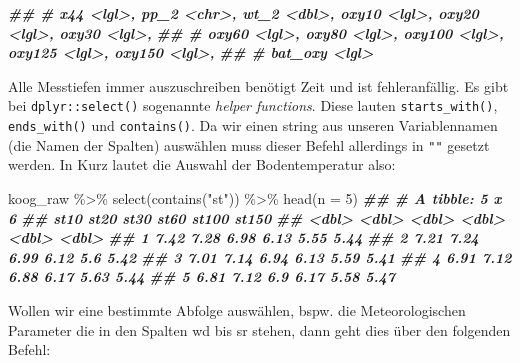 \documentclass[
]{article}
\newenvironment{Shaded}{\begin{snugshade}}{\end{snugshade}}
\newcommand{\AttributeTok}[1]{\textcolor[rgb]{0.77,0.63,0.00}{#1}}
\newcommand{\DecValTok}[1]{\textcolor[rgb]{0.00,0.00,0.81}{#1}}
\newcommand{\DocumentationTok}[1]{\textcolor[rgb]{0.56,0.35,0.01}{\textbf{\textit{#1}}}}
\newcommand{\FunctionTok}[1]{\textcolor[rgb]{0.00,0.00,0.00}{#1}}
\newcommand{\NormalTok}[1]{#1}
\newcommand{\SpecialCharTok}[1]{\textcolor[rgb]{0.00,0.00,0.00}{#1}}
\newcommand{\StringTok}[1]{\textcolor[rgb]{0.31,0.60,0.02}{#1}}
\begin{document}
\begin{Shaded}
\begin{Highlighting}[]
\DocumentationTok{\#\# \#   x44 \textless{}lgl\textgreater{}, pp\_2 \textless{}chr\textgreater{}, wt\_2 \textless{}dbl\textgreater{}, oxy10 \textless{}lgl\textgreater{}, oxy20 \textless{}lgl\textgreater{}, oxy30 \textless{}lgl\textgreater{},}
\DocumentationTok{\#\# \#   oxy60 \textless{}lgl\textgreater{}, oxy80 \textless{}lgl\textgreater{}, oxy100 \textless{}lgl\textgreater{}, oxy125 \textless{}lgl\textgreater{}, oxy150 \textless{}lgl\textgreater{},}
\DocumentationTok{\#\# \#   bat\_oxy \textless{}lgl\textgreater{}}
\end{Highlighting}
\end{Shaded}

Alle Messtiefen immer auszuschreiben benötigt Zeit und ist fehleranfällig. Es gibt bei \texttt{dplyr::select()} sogenannte \emph{helper functions}. Diese lauten \texttt{starts\_with()}, \texttt{ends\_with()} und \texttt{contains()}. Da wir einen string aus unseren Variablennamen (die Namen der Spalten) auswählen muss dieser Befehl allerdings in \texttt{""} gesetzt werden. In Kurz lautet die Auswahl der Bodentemperatur also:

\begin{Shaded}
\begin{Highlighting}[]
\NormalTok{koog\_raw }\SpecialCharTok{\%\textgreater{}\%}
  \FunctionTok{select}\NormalTok{(}\FunctionTok{contains}\NormalTok{(}\StringTok{"st"}\NormalTok{)) }\SpecialCharTok{\%\textgreater{}\%}
  \FunctionTok{head}\NormalTok{(}\AttributeTok{n =} \DecValTok{5}\NormalTok{)}
\DocumentationTok{\#\# \# A tibble: 5 x 6}
\DocumentationTok{\#\#    st10  st20  st30  st60 st100 st150}
\DocumentationTok{\#\#   \textless{}dbl\textgreater{} \textless{}dbl\textgreater{} \textless{}dbl\textgreater{} \textless{}dbl\textgreater{} \textless{}dbl\textgreater{} \textless{}dbl\textgreater{}}
\DocumentationTok{\#\# 1  7.42  7.28  6.98  6.13  5.55  5.44}
\DocumentationTok{\#\# 2  7.21  7.24  6.99  6.12  5.6   5.42}
\DocumentationTok{\#\# 3  7.01  7.14  6.94  6.13  5.59  5.41}
\DocumentationTok{\#\# 4  6.91  7.12  6.88  6.17  5.63  5.44}
\DocumentationTok{\#\# 5  6.81  7.12  6.9   6.17  5.58  5.47}
\end{Highlighting}
\end{Shaded}

Wollen wir eine bestimmte Abfolge auswählen, bspw. die Meteorologischen Parameter die in den Spalten wd bis sr stehen, dann geht dies über den folgenden Befehl:
\end{document}
